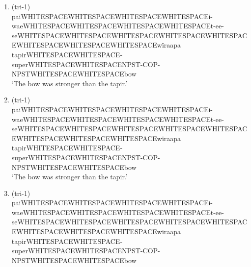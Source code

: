 \documentclass{article}
\begin{document}
\begin{enumerate}
\def\labelenumi{(\arabic{enumi})}
\setcounter{enumi}{2}
\item
  (tri-1)\\
  pai\textbar WHITESPACE\textbar\textbar WHITESPACE\textbar\textbar WHITESPACE\textbar\textbar WHITESPACE\textbar i-wae\textbar WHITESPACE\textbar\textbar WHITESPACE\textbar\textbar WHITESPACE\textbar\textbar WHITESPACE\textbar t-ee-se\textbar WHITESPACE\textbar\textbar WHITESPACE\textbar\textbar WHITESPACE\textbar\textbar WHITESPACE\textbar\textbar WHITESPACE\textbar\textbar WHITESPACE\textbar\textbar WHITESPACE\textbar\textbar WHITESPACE\textbar wïraapa\\
  tapir\textbar WHITESPACE\textbar\textbar WHITESPACE-super\textbar WHITESPACE\textbar\textbar WHITESPACE\textbar NPST-COP-NPST\textbar WHITESPACE\textbar\textbar WHITESPACE\textbar bow\\
  `The bow was stronger than the tapir.'
\item
  (tri-1)\\
  pai\textbar WHITESPACE\textbar\textbar WHITESPACE\textbar\textbar WHITESPACE\textbar\textbar WHITESPACE\textbar i-wae\textbar WHITESPACE\textbar\textbar WHITESPACE\textbar\textbar WHITESPACE\textbar\textbar WHITESPACE\textbar t-ee-se\textbar WHITESPACE\textbar\textbar WHITESPACE\textbar\textbar WHITESPACE\textbar\textbar WHITESPACE\textbar\textbar WHITESPACE\textbar\textbar WHITESPACE\textbar\textbar WHITESPACE\textbar\textbar WHITESPACE\textbar wïraapa\\
  tapir\textbar WHITESPACE\textbar\textbar WHITESPACE-super\textbar WHITESPACE\textbar\textbar WHITESPACE\textbar NPST-COP-NPST\textbar WHITESPACE\textbar\textbar WHITESPACE\textbar bow\\
  `The bow was stronger than the tapir.'
\item
  (tri-1)\\
  pai\textbar WHITESPACE\textbar\textbar WHITESPACE\textbar\textbar WHITESPACE\textbar\textbar WHITESPACE\textbar i-wae\textbar WHITESPACE\textbar\textbar WHITESPACE\textbar\textbar WHITESPACE\textbar\textbar WHITESPACE\textbar t-ee-se\textbar WHITESPACE\textbar\textbar WHITESPACE\textbar\textbar WHITESPACE\textbar\textbar WHITESPACE\textbar\textbar WHITESPACE\textbar\textbar WHITESPACE\textbar\textbar WHITESPACE\textbar\textbar WHITESPACE\textbar wïraapa\\
  tapir\textbar WHITESPACE\textbar\textbar WHITESPACE-super\textbar WHITESPACE\textbar\textbar WHITESPACE\textbar NPST-COP-NPST\textbar WHITESPACE\textbar\textbar WHITESPACE\textbar bow\\

\end{enumerate}
\end{document}
